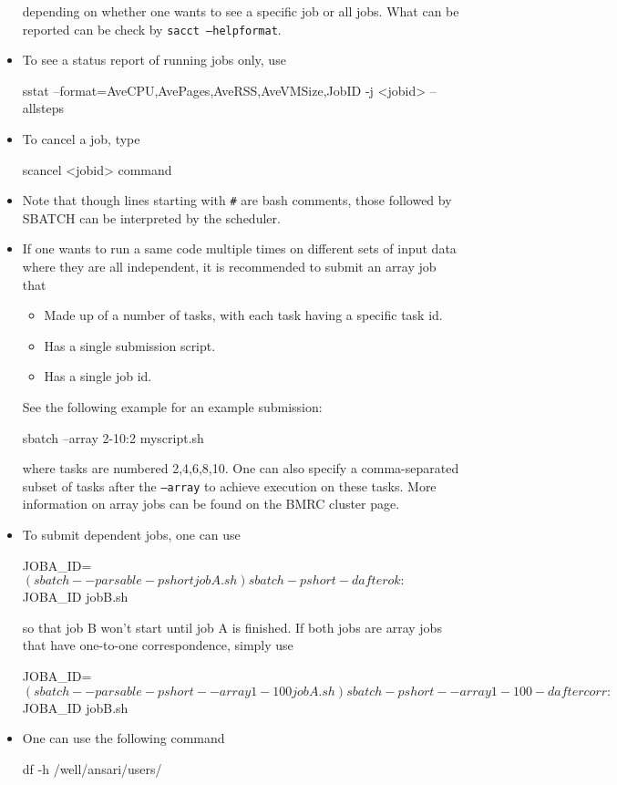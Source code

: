 \documentclass[UTF8]{book}
\newcommand{\code}[1]{\colorbox{codegray}{\texttt{#1}}}
\begin{document}
\begin{itemize}
\begin{bash}
\end{bash}
depending on whether one wants to see a specific job or all jobs. What can be reported can be check by \code{sacct --helpformat}.
\item To see a status report of running jobs only, use
\begin{bash}
sstat --format=AveCPU,AvePages,AveRSS,AveVMSize,JobID -j <jobid> --allsteps
\end{bash}
\item To cancel a job, type
\begin{bash}
scancel <jobid> command
\end{bash}
\item Note that though lines starting with \code{\#} are bash comments, those followed by SBATCH can be interpreted by the scheduler.
\item If one wants to run a same code multiple times on different sets of input data where they are all independent, it is recommended to submit an array job that
\begin{itemize}
	\item Made up of a number of tasks, with each task having a specific task id.
	\item Has a single submission script.
	\item Has a single job id.
\end{itemize}
See the following example for an example submission:
\begin{bash}
sbatch --array 2-10:2 myscript.sh
\end{bash}
where tasks are numbered 2,4,6,8,10. One can also specify a comma-separated subset of tasks after the \code{--array} to achieve execution on these tasks. More information on array jobs can be found on the BMRC cluster page.
\item To submit dependent jobs, one can use
\begin{bash}
JOBA_ID=$(sbatch --parsable -p short jobA.sh) 
sbatch -p short -d afterok:$JOBA_ID jobB.sh 
\end{bash}
so that job B won't start until job A is finished. If both jobs are array jobs that have one-to-one correspondence, simply use
\begin{bash}
JOBA_ID=$(sbatch --parsable -p short --array 1-100 jobA.sh) 
sbatch -p short --array 1-100 -d aftercorr:$JOBA_ID jobB.sh 
\end{bash}
\item One can use the following command
\begin{bash}
df -h /well/ansari/users/

\end{bash}
\end{itemize}
\end{document}
